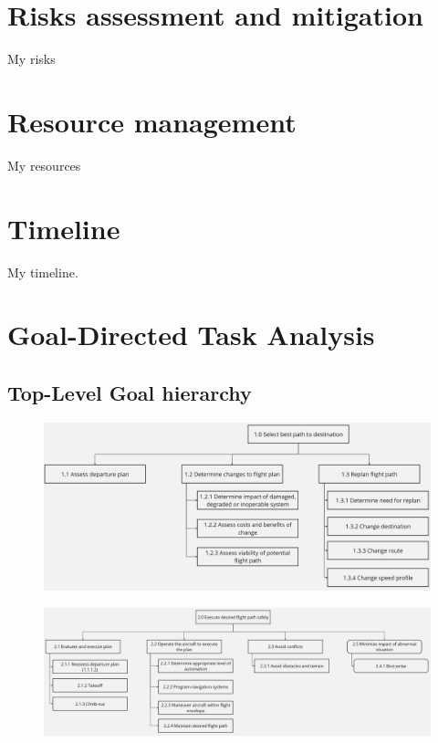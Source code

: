 \documentclass[12pt,a4paper]{article} %
\begin{document}
	\section{Risks assessment and mitigation}
	My risks
	
	\section{Resource management}
	My resources
	
	\section{Timeline}
	My timeline.

	\appendix
	\section{Goal-Directed Task Analysis}
	\label{appendix:GDTA}
	\subsection{Top-Level Goal hierarchy}

	\begin{figure}[H]
		\centering
		\includegraphics[width=1.0\textwidth]{./images/GDTA/top-goal-1.jpg}
		\label{gdta:top-1}
	\end{figure}

	\begin{figure}[H]
		\centering
		\includegraphics[width=1.0\textwidth]{./images/GDTA/top-goal-2.jpg}
		\label{gdta:top-2}
	\end{figure}
\end{document}

